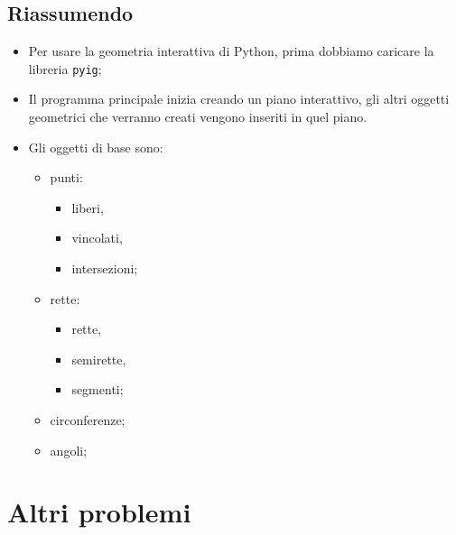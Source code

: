 \newpage %

\subsection{Riassumendo}
\begin{itemize} [noitemsep]
\item Per usare la geometria interattiva di Python, prima dobbiamo 
caricare la libreria \lstinline{pyig};
\item Il programma principale inizia creando un piano interattivo, gli altri 
oggetti geometrici che verranno creati vengono inseriti in quel piano.
\item Gli oggetti di base sono:
\begin{multicols}{3}
\begin{itemize} [nosep]
\item punti:
\begin{itemize} [nosep]
\item liberi,
\item vincolati,
\item intersezioni;
\end{itemize}

\item rette:
\begin{itemize} [nosep]
\item rette,
\item semirette,
\item segmenti;
\end{itemize}
\item circonferenze;
\item angoli;
\end{itemize}
\end{multicols}
\end{itemize}

\section{Altri problemi}

